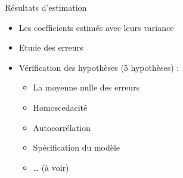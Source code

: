 \documentclass[11pt,ignorenonframetext,]{beamer}
\providecommand{\tightlist}{%
  \setlength{\itemsep}{0pt}\setlength{\parskip}{0pt}}
\begin{document}
\begin{frame}{Résultats d'estimation}
\protect\hypertarget{resultats-destimation}{}

\begin{itemize}
\tightlist
\item
  Les coefficients estimés avec leurs variance
\item
  Etude des erreurs
\item
  Vérification des hypothèses (5 hypothèses) :

  \begin{itemize}
  \tightlist
  \item
    La moyenne nulle des erreurs
  \item
    Homoscedacité
  \item
    Autocorrélation
  \item
    Spécification du modèle
  \item
    \ldots{} (à voir)
  \end{itemize}
\end{itemize}

\end{frame}
\end{document}
